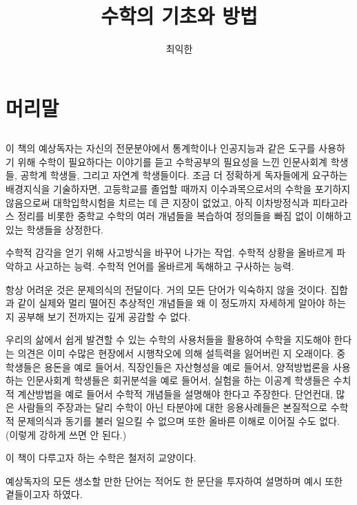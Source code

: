 \documentclass{../../large}
\begin{document}
\title{수학의 기초와 방법}
\author{최익한}
\maketitle

\chapter*{머리말}

\section*{}


이 책의 예상독자는 자신의 전문분야에서 통계학이나 인공지능과 같은 도구를 사용하기 위해 수학이 필요하다는 이야기를 듣고 수학공부의 필요성을 느낀 인문사회계 학생들, 공학계 학생들, 그리고 자연계 학생들이다.
조금 더 정확하게 독자들에게 요구하는 배경지식을 기술하자면, 고등학교를 졸업할 때까지 이수과목으로서의 수학을 포기하지 않음으로써 대학입학시험을 치르는 데 큰 지장이 없었고, 아직 이차방정식과 피타고라스 정리를 비롯한 중학교 수학의 여러 개념들을 복습하여 정의들을 빠짐 없이 이해하고 있는 학생들을 상정한다.


수학적 감각을 얻기 위해 사고방식을 바꾸어 나가는 작업.
수학적 상황을 올바르게 파악하고 사고하는 능력.
수학적 언어를 올바르게 독해하고 구사하는 능력.


항상 어려운 것은 문제의식의 전달이다.
거의 모든 단어가 익숙하지 않을 것이다.
집합과 같이 실제와 멀리 떨어진 추상적인 개념들을 왜 이 정도까지 자세하게 알아야 하는지 공부해 보기 전까지는 깊게 공감할 수 없다.


우리의 삶에서 쉽게 발견할 수 있는 수학의 사용처들을 활용하여 수학을 지도해야 한다는 의견은 이미 수많은 현장에서 시행착오에 의해 설득력을 잃어버린 지 오래이다.
중학생들은 용돈을 예로 들어서, 직장인들은 자산형성을 예로 들어서, 양적방법론을 사용하는 인문사회계 학생들은 회귀분석을 예로 들어서, 실험을 하는 이공계 학생들은 수치적 계산방법을 예로 들어서 수학적 개념들을 설명해야 한다고 주장한다.
단언컨대, 많은 사람들의 주장과는 달리 수학이 아닌 타분야에 대한 응용사례들은 본질적으로 수학적 문제의식과 동기를 불러 일으킬 수 없으며 또한 올바른 이해로 이어질 수도 없다. (이렇게 강하게 쓰면 안 된다.)

이 책이 다루고자 하는 수학은 철저히 교양이다.




예상독자의 모든 생소할 만한 단어는 적어도 한 문단을 투자하여 설명하며 예시 또한 곁들이고자 하였다.
\end{document}
